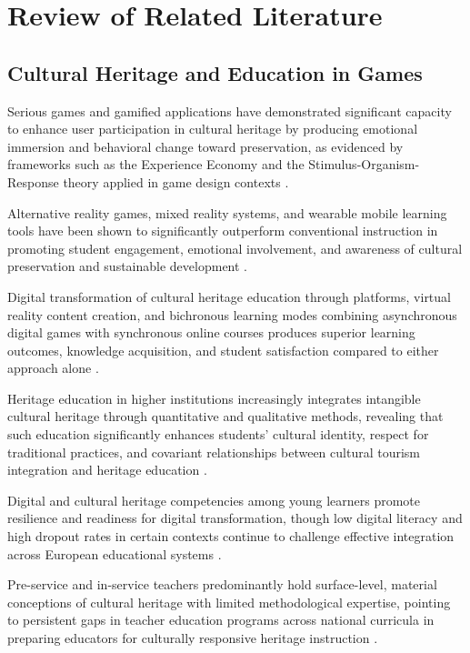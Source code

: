 \documentclass{research}
\begin{document}
\section{Review of Related Literature}

\subsection{Cultural Heritage and Education in Games}

Serious games and gamified applications have demonstrated significant capacity to
enhance user participation in cultural heritage by producing emotional immersion and
behavioral change toward preservation, as evidenced by frameworks such as the Experience
Economy and the Stimulus-Organism-Response theory applied in game design contexts
\citep{zhang2024,dankov2023,wu2023,cassone2021}.

Alternative reality games, mixed reality systems, and wearable mobile learning tools
have been shown to significantly outperform conventional instruction in promoting student
engagement, emotional involvement, and awareness of cultural preservation and sustainable
development \citep{lin2024,huang2023,stylianidis2025,tian2025}.

Digital transformation of cultural heritage education through platforms, virtual reality
content creation, and bichronous learning modes combining asynchronous digital games
with synchronous online courses produces superior learning outcomes, knowledge
acquisition, and student satisfaction compared to either approach alone
\citep{lai2025,li2025,guo2025,diblas2010}.

Heritage education in higher institutions increasingly integrates intangible cultural
heritage through quantitative and qualitative methods, revealing that such education
significantly enhances students' cultural identity, respect for traditional practices,
and covariant relationships between cultural tourism integration and heritage education
\citep{xu2023,yan2023,brumana2022,santos2024}.

Digital and cultural heritage competencies among young learners promote resilience and
readiness for digital transformation, though low digital literacy and high dropout rates
in certain contexts continue to challenge effective integration across European
educational systems \citep{orphanidou2024,jangra2025,lofstrom2024}.

Pre-service and in-service teachers predominantly hold surface-level, material
conceptions of cultural heritage with limited methodological expertise, pointing to
persistent gaps in teacher education programs across national curricula in preparing
educators for culturally responsive heritage instruction
\citep{cuenca2021,miguelrevilla2024,gulya2024,pitri2025}.
\end{document}
